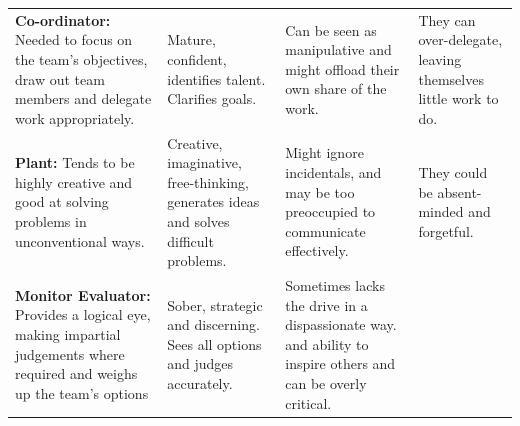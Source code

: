 \documentclass[]{book}
\begin{document}
\begin{longtable}[]{@{}llll@{}}
\begin{minipage}[t]{0.21\columnwidth}\raggedright
\textbf{Co-ordinator:} Needed to focus on the team's objectives, draw out team members and delegate work appropriately.\strut
\end{minipage} & \begin{minipage}[t]{0.25\columnwidth}\raggedright
Mature, confident, identifies talent. Clarifies goals.\strut
\end{minipage} & \begin{minipage}[t]{0.20\columnwidth}\raggedright
Can be seen as manipulative and might offload their own share of the work.\strut
\end{minipage} & \begin{minipage}[t]{0.22\columnwidth}\raggedright
They can over-delegate, leaving themselves little work to do.\strut
\end{minipage}\tabularnewline
\begin{minipage}[t]{0.21\columnwidth}\raggedright
\textbf{Plant:} Tends to be highly creative and good at solving problems in unconventional ways.\strut
\end{minipage} & \begin{minipage}[t]{0.25\columnwidth}\raggedright
Creative, imaginative, free-thinking, generates ideas and solves difficult problems.\strut
\end{minipage} & \begin{minipage}[t]{0.20\columnwidth}\raggedright
Might ignore incidentals, and may be too preoccupied to communicate effectively.\strut
\end{minipage} & \begin{minipage}[t]{0.22\columnwidth}\raggedright
They could be absent-minded and forgetful.\strut
\end{minipage}\tabularnewline
\begin{minipage}[t]{0.21\columnwidth}\raggedright
\textbf{Monitor Evaluator:} Provides a logical eye, making impartial judgements where required and weighs up the team's options\strut
\end{minipage} & \begin{minipage}[t]{0.25\columnwidth}\raggedright
Sober, strategic and discerning. Sees all options and judges accurately.\strut
\end{minipage} & \begin{minipage}[t]{0.20\columnwidth}\raggedright
Sometimes lacks the drive in a dispassionate way. and ability to inspire others and can be overly critical.\strut
\end{minipage} & \begin{minipage}[t]{0.22\columnwidth}\raggedright

\end{minipage}
\end{longtable}
\end{document}
